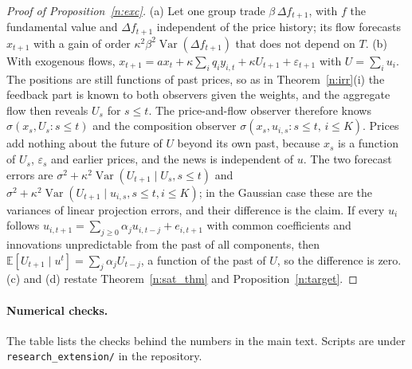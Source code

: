 \begin{proof}[Proof of Proposition~\ref{n:exc}]
(a) Let one group trade $\beta\,\Delta f_{t+1}$, with $f$ the fundamental value and $\Delta f_{t+1}$ independent of the price history; its flow forecasts $x_{t+1}$ with a gain of order $\kappa^2\beta^2\operatorname{Var}(\Delta f_{t+1})$ that does not depend on $T$. (b) With exogenous flows, $x_{t+1}=ax_t+\kappa\sum_iq_iy_{i,t}+\kappa U_{t+1}+\varepsilon_{t+1}$ with $U=\sum_iu_i$. The positions are still functions of past prices, so as in Theorem~\ref{n:irr}(i) the feedback part is known to both observers given the weights, and the aggregate flow then reveals $U_s$ for $s\le t$. The price-and-flow observer therefore knows $\sigma(x_s,U_s:s\le t)$ and the composition observer $\sigma(x_s,u_{i,s}:s\le t,\,i\le K)$. Prices add nothing about the future of $U$ beyond its own past, because $x_s$ is a function of $U_s$, $\varepsilon_s$ and earlier prices, and the news is independent of $u$. The two forecast errors are $\sigma^2+\kappa^2\operatorname{Var}(U_{t+1}\mid U_s,s\le t)$ and $\sigma^2+\kappa^2\operatorname{Var}(U_{t+1}\mid u_{i,s},s\le t,i\le K)$; in the Gaussian case these are the variances of linear projection errors, and their difference is the claim. If every $u_i$ follows $u_{i,t+1}=\sum_{j\ge0}\alpha_ju_{i,t-j}+e_{i,t+1}$ with common coefficients and innovations unpredictable from the past of all components, then $\mathbb E[U_{t+1}\mid u^t]=\sum_j\alpha_jU_{t-j}$, a function of the past of $U$, so the difference is zero. (c) and (d) restate Theorem~\ref{n:sat_thm} and Proposition~\ref{n:target}.
\end{proof}

\paragraph{Numerical checks.} The table lists the checks behind the numbers in the main text. Scripts are under \nolinkurl{research_extension/} in the repository.

